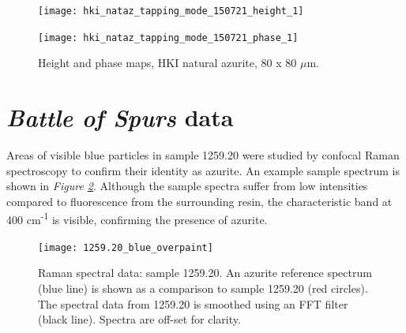\begin{figure}[H]
\centering
\begin{minipage}{.45\textwidth}
  \centering
  \texttt{[image: hki\_nataz\_tapping\_mode\_150721\_height\_1]}
\end{minipage}
\begin{minipage}{.45\textwidth}
  \centering
  \texttt{[image: hki\_nataz\_tapping\_mode\_150721\_phase\_1]}
\end{minipage}
\caption[Height and phase maps, HKI natural azurite]{Height and phase maps, HKI natural azurite, 80 x 80 $\mu$m.}
\label{fig:afm_hki_nataz_height_phase_1}
\end{figure}


\section[Battle of Spurs data]{\textit{Battle of Spurs} data}
\label{section3.5}

Areas of visible blue particles in sample 1259.20 were studied by confocal Raman spectroscopy to confirm their identity as azurite. An example sample spectrum is shown in \textit{Figure \ref{fig:raman_1259-20}}. Although the sample spectra suffer from low intensities compared to fluorescence from the surrounding resin, the characteristic band at 400 cm\textsuperscript{-1} is visible, confirming the presence of azurite.

\begin{figure}[H] %
\centering
  \texttt{[image: 1259.20\_blue\_overpaint]}
\caption[Raman spectral data, 1259.20]{Raman spectral data: sample 1259.20. An azurite reference spectrum (blue line) is shown as a comparison to sample 1259.20 (red circles). The spectral data from 1259.20 is smoothed using an FFT filter (black line). Spectra are off-set for clarity.}
\label{fig:raman_1259-20}
\end{figure}

